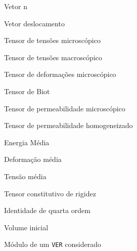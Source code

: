 \item[$ \vetorn $] 						Vetor n
\item[$ \desloc $] 						Vetor deslocamento
\item[$ \tensorsigma $] 				Tensor de tensões microscópico
\item[$ \tensorSigma $]					Tensor de tensões macroscópico
\item[$ \tensorepsilon $] 				Tensor de deformações microscópico
\item[$ \tensorBiot $] 					Tensor de Biot
\item[$ \tensorpermeabilidademicro $] 	Tensor de permeabilidade microscópico
\item[$ \tensorpermeabilidadehom $] 	Tensor de permeabilidade homogeneizado
\item[$ \energiamedia $] 				Energia Média
\item[$ \defmedia $] 					Deformação média
\item[$ \tensaomedia $] 				Tensão média
\item[$ \tensorC $] 					Tensor constitutivo de rigidez
\item[$ \identidadequarta $] 			Identidade de quarta ordem
\item[$ \volumeinicial $]				Volume inicial
\item[$ \volume $] 						Módulo de um \texttt{VER} considerado





